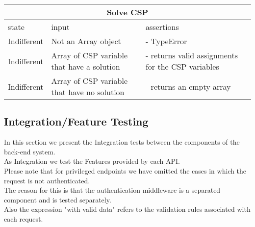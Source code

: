 \begin{center}
	\begin{tabular}{|p{}|p{}|p{}|}
		\hline
		\multicolumn{3}{c}{Solve CSP}\\
		\hline
		state & input & assertions \\

		\hline
		Indifferent &
		Not an Array object& 
		- TypeError
		\\
		\hline
		Indifferent &
		Array of CSP variable that have a solution& 
		- returns valid assignments for the CSP variables\\
		\hline
		Indifferent &
		Array of CSP variable that have no solution & 
		- returns an empty array\\
		\hline
	\end{tabular}
\end{center}

\subsection{Integration/Feature Testing}
In this section we present the Integration tests between the components of the back-end system.\\
As Integration we test the Features provided by each API.\\
Please note that for privileged endpoints we have omitted the cases in which the request is not authenticated. \\
The reason for this is that the authentication middleware is a separated component and is tested separately.\\
Also the expression "with valid data" refers to the validation rules associated with each request.

